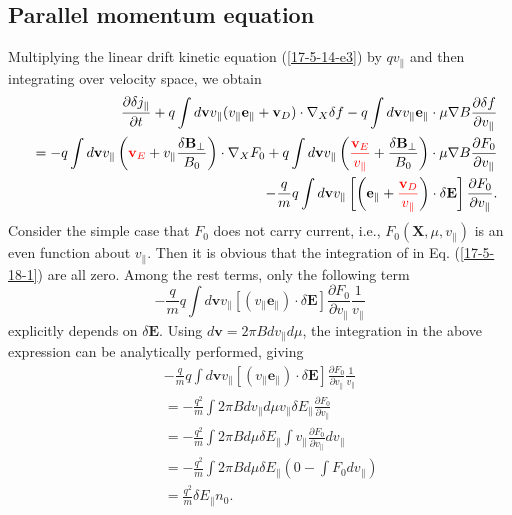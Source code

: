 \documentclass{article}
\newcommand{\tmcolor}[2]{{\color{#1}{#2}}}
\begin{document}
\subsection{Parallel momentum equation}

Multiplying the linear drift kinetic equation (\ref{17-5-14-e3}) by $q
v_{\parallel}$ and then integrating over velocity space, we obtain
\begin{eqnarray}
  &  & \frac{\partial \delta j_{\parallel}}{\partial t} + q \int
  d\mathbf{v}v_{\parallel} (v_{\parallel} \mathbf{e}_{\parallel}
  +\mathbf{v}_D) \cdot \nabla_X \delta f - q \int d\mathbf{v}v_{\parallel}
  \mathbf{e}_{\parallel} \cdot \mu \nabla B \frac{\partial \delta f}{\partial
  v_{\parallel}} \nonumber\\
  &  & = - q \int d\mathbf{v}v_{\parallel} \left( \tmcolor{red}{\mathbf{v}_E}
  + v_{\parallel} \frac{\delta \mathbf{B}_{\perp}}{B_0} \right) \cdot \nabla_X
  F_0 + q \int d\mathbf{v}v_{\parallel} \left(
  \tmcolor{red}{\frac{\mathbf{v}_E}{v_{\parallel}}} + \frac{\delta
  \mathbf{B}_{\perp}}{B_0} \right) \cdot \mu \nabla B \frac{\partial
  F_0}{\partial v_{\parallel}} \nonumber\\
  &  & - \frac{q}{m} q \int d\mathbf{v}v_{\parallel} \left[ \left(
  \mathbf{e}_{\parallel} + \tmcolor{red}{\frac{\mathbf{v}_D}{v_{\parallel}}}
  \right) \cdot \delta \mathbf{E} \right] \frac{\partial F_0}{\partial
  v_{\parallel}} .  \label{17-5-18-1}
\end{eqnarray}
Consider the simple case that $F_0$ does not carry current, i.e., $F_0
(\mathbf{X}, \mu, v_{\parallel})$ is an even function about $v_{\parallel}$.
Then it is obvious that the integration of \tmcolor{red}{the terms in red} in
Eq. (\ref{17-5-18-1}) are all zero. Among the rest terms, only the following
term
\begin{equation}
  \label{17-5-15-p3} - \frac{q}{m} q \int d\mathbf{v}v_{\parallel}
  [(v_{\parallel} \mathbf{e}_{\parallel}) \cdot \delta \mathbf{E}]
  \frac{\partial F_0}{\partial v_{\parallel}}  \frac{1}{v_{\parallel}}
\end{equation}
explicitly depends on $\delta \mathbf{E}$. Using $d\mathbf{v}= 2 \pi B d
v_{\parallel} d \mu$, the integration in the above expression can be
analytically performed, giving
\begin{eqnarray}
  &  & - \frac{q}{m} q \int d\mathbf{v}v_{\parallel} [(v_{\parallel}
  \mathbf{e}_{\parallel}) \cdot \delta \mathbf{E}] \frac{\partial
  F_0}{\partial v_{\parallel}}  \frac{1}{v_{\parallel}} \nonumber\\
  &  & = - \frac{q^2}{m} \int 2 \pi B d v_{\parallel} d \mu v_{\parallel}
  \delta E_{\parallel} \frac{\partial F_0}{\partial v_{\parallel}} 
  \nonumber\\
  &  & = - \frac{q^2}{m} \int 2 \pi B d \mu \delta E_{\parallel} \int
  v_{\parallel} \frac{\partial F_0}{\partial v_{\parallel}} d v_{\parallel}
  \nonumber\\
  &  & = - \frac{q^2}{m} \int 2 \pi B d \mu \delta E_{\parallel} \left( 0 -
  \int F_0 d v_{\parallel} \right) \nonumber\\
  &  & = \frac{q^2}{m} \delta E_{\parallel} n_0 . 
\end{eqnarray}
\end{document}
